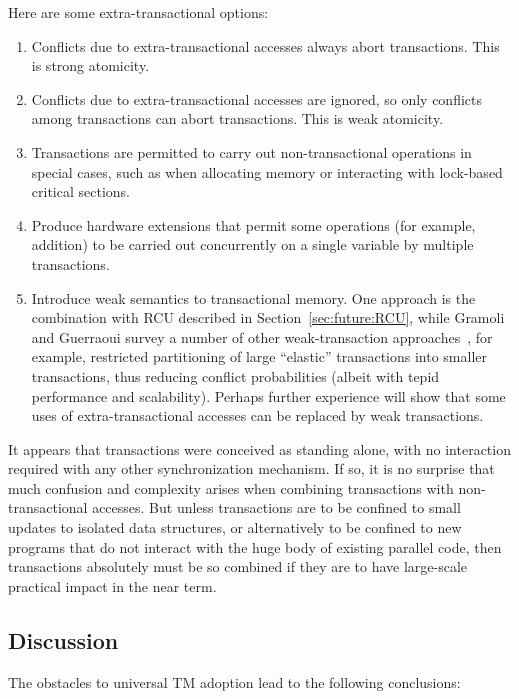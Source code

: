 Here are some extra-transactional options:

\begin{enumerate}
\item	Conflicts due to extra-transactional accesses always abort
	transactions.
	This is strong atomicity.
\item	Conflicts due to extra-transactional accesses are ignored,
	so only conflicts among transactions can abort transactions.
	This is weak atomicity.
\item	Transactions are permitted to carry out non-transactional
	operations in special cases, such as when allocating memory or
	interacting with lock-based critical sections.
\item	Produce hardware extensions that permit some operations
	(for example, addition) to be carried out concurrently on a
	single variable by multiple transactions.
\item	Introduce weak semantics to transactional memory.
	One approach is the combination with RCU described in
	Section~\ref{sec:future:RCU}, while Gramoli and Guerraoui
	survey a number of other weak-transaction
	approaches~\cite{Gramoli:2014:DTP:2541883.2541900}, for example,
	restricted partitioning of large
	``elastic'' transactions into smaller transactions, thus
	reducing conflict probabilities (albeit with tepid performance
	and scalability).
	Perhaps further experience will show that some uses of
	extra-transactional accesses can be replaced by weak
	transactions.
\end{enumerate}

It appears that transactions were conceived as standing alone, with no
interaction required with any other synchronization mechanism.
If so, it is no surprise that much confusion and complexity arises when
combining transactions with non-transactional accesses.
But unless transactions are to be confined to small updates to isolated
data structures, or alternatively to be confined to new programs
that do not interact with the huge body of existing parallel code,
then transactions absolutely must be so combined if they are to have
large-scale practical impact in the near term.


\subsection{Discussion}
\label{sec:future:Discussion}

The obstacles to universal TM adoption lead to the following
conclusions:

